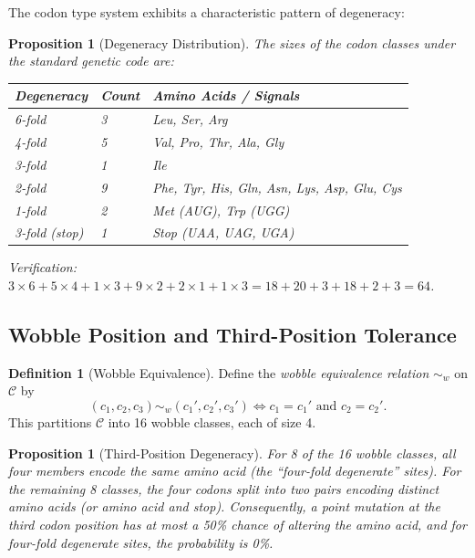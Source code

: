 \documentclass[12pt,a4paper]{article}
\newtheorem{proposition}[theorem]{Proposition}
\theoremstyle{definition}
\newtheorem{definition}[theorem]{Definition}
\begin{document}
The codon type system exhibits a characteristic pattern of degeneracy:

\begin{proposition}[Degeneracy Distribution]\label{prop:degeneracy}
The sizes of the codon classes under the standard genetic code are:
\begin{center}
\begin{tabular}{lll}
\toprule
\textbf{Degeneracy} & \textbf{Count} & \textbf{Amino Acids / Signals} \\
\midrule
6-fold & 3 & Leu, Ser, Arg \\
4-fold & 5 & Val, Pro, Thr, Ala, Gly \\
3-fold & 1 & Ile \\
2-fold & 9 & Phe, Tyr, His, Gln, Asn, Lys, Asp, Glu, Cys \\
1-fold & 2 & Met (AUG), Trp (UGG) \\
3-fold (stop) & 1 & Stop (UAA, UAG, UGA) \\
\bottomrule
\end{tabular}
\end{center}
Verification: $3 \times 6 + 5 \times 4 + 1 \times 3 + 9 \times 2 + 2 \times 1 + 1 \times 3 = 18 + 20 + 3 + 18 + 2 + 3 = 64$.
\end{proposition}

\subsection{Wobble Position and Third-Position Tolerance}

\begin{definition}[Wobble Equivalence]\label{def:wobble}
Define the \emph{wobble equivalence relation} $\sim_w$ on $\mathcal{C}$ by
\[
  (c_1, c_2, c_3) \sim_w (c_1', c_2', c_3') \iff c_1 = c_1' \text{ and } c_2 = c_2'.
\]
This partitions $\mathcal{C}$ into 16 wobble classes, each of size 4.
\end{definition}

\begin{proposition}[Third-Position Degeneracy]\label{prop:wobble}
For 8 of the 16 wobble classes, all four members encode the same amino acid (the ``four-fold degenerate'' sites). For the remaining 8 classes, the four codons split into two pairs encoding distinct amino acids (or amino acid and stop). Consequently, a point mutation at the third codon position has at most a 50\% chance of altering the amino acid, and for four-fold degenerate sites, the probability is 0\%.
\end{proposition}
\end{document}
